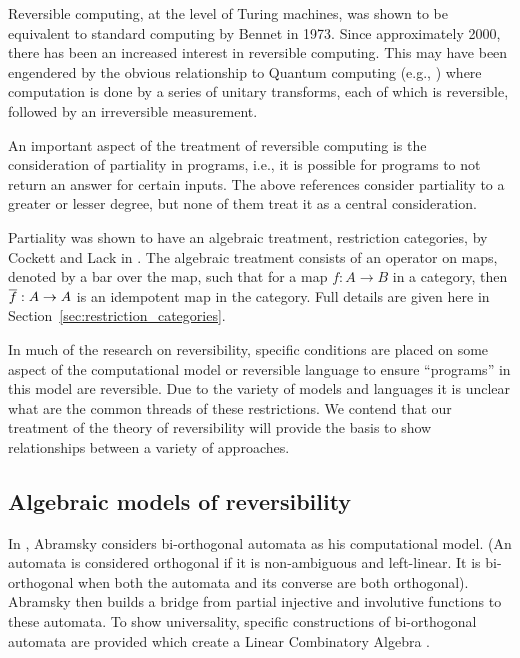 Reversible computing, at the level of Turing machines, was shown to be equivalent to standard
computing by Bennet \cite{bennett:1973reverse} in 1973. Since approximately 2000, there has
been an increased interest in reversible computing. This may have been engendered by the obvious relationship
to Quantum computing (e.g., \cite{neilsen2000:QuantumComputationAndInfo}) where computation is done
by a series of unitary transforms, each of which is reversible, followed by an irreversible
measurement.

An important aspect of the treatment of reversible computing is the consideration of partiality in
programs, i.e., it is possible for programs to not return an answer for certain inputs. The above
references consider partiality to a greater or lesser degree, but none of them treat it as a central
consideration.

Partiality was shown to have an algebraic treatment, restriction categories, by Cockett and Lack in
\cite{cockett2002:restcategories1,cockettlack2003:restcategories2,cockettlack2004:restcategories3}. The
algebraic treatment consists of an operator on maps, denoted by a bar over the map, such that for a
map $f:A\to B$ in a category, then $\overline{f}:A\to A$ is an idempotent map in the category. Full
details are given here in Section~\ref{sec:restriction_categories}.

In much of the research on reversibility, specific conditions are placed on some aspect of the
computational model or reversible language to ensure ``programs'' in this model are reversible. Due
to the variety of models and languages it is unclear what are the common threads of these restrictions.
We contend that our treatment of the theory of reversibility will provide the basis to show
relationships between a variety of approaches.

\subsection{Algebraic models of reversibility}
\label{subsec:algebraic_models_of_reversibility}
In \cite{abramsky05:reversible}, Abramsky considers bi-orthogonal automata as his computational
model. (An automata is considered orthogonal if it is non-ambiguous and left-linear. It is
bi-orthogonal when both the automata and its converse are both orthogonal). Abramsky then builds a
bridge from partial injective and involutive functions to these automata. To show universality,
specific constructions of bi-orthogonal automata are provided which create a Linear Combinatory Algebra
\cite{abramsky02:GOI}.

